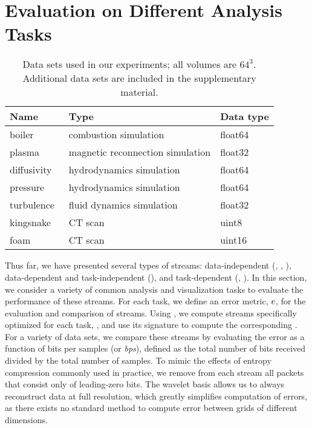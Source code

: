 \section{Evaluation on Different Analysis Tasks} \label{sec:analysis-tasks}

\begin{table}[!t]
  \centering
	\begin{tabular}{l l l}
  \toprule
  Name & Type & Data type \\
  \midrule
  boiler~\cite{boiler} & combustion simulation& float64\\
  plasma~\cite{magnetic} & magnetic reconnection simulation& float32\\
  diffusivity~\cite{cook_cabot_miller_2004} & hydrodynamics simulation& float64\\
  pressure~\cite{cook_cabot_miller_2004} & hydrodynamics simulation& float64\\
	turbulence~\cite{turbulence} & fluid dynamics simulation& float32\\
	kingsnake~\cite{kingsnake} & CT scan & uint8\\
	foam~\cite{foam} & CT scan & uint16\\
  \bottomrule
  \end{tabular}\label{tbl:data-sets}
  \vspace{-0.5em}
   \caption{Data sets used in our experiments; all volumes are $64^3$. Additional data sets are 
   included in the supplementary material.}
  \vspace{-2em}
\end{table}

Thus far, we have presented several types of streams: data-independent (\slvl, \sbit, \swav),
data-dependent and task-independent (\smag), and task-dependent (\sopt, \ssig). In this section, we
consider a variety of common analysis and visualization tasks to evaluate the performance of these
streams. For each task, we define an error metric, $e$, for the evaluation and comparison of
streams. Using , we compute streams specifically optimized for each task, \stkop,
and use its signature to compute the corresponding \stksg. For a variety of data sets, we compare
these streams by evaluating the error as a function of bits per samples (or \emph{bps}), defined as
the total number of bits received divided by the total number of samples. To mimic the effects of
entropy compression commonly used in practice, we remove from each stream all packets that consist
only of leading-zero bits. The wavelet basis allows us to always reconstruct data at full
resolution, which greatly simplifies computation of errors, as there exists no standard method to
compute error between grids of different dimensions.

